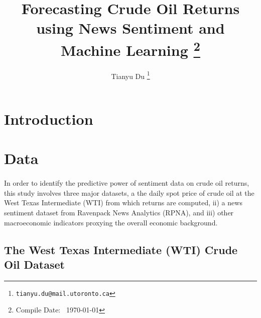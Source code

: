 \documentclass[12pt]{article}
\title{Forecasting Crude Oil Returns using News Sentiment and Machine Learning \footnote{Compile Date: \currenttime\ \today}}
\author{Tianyu Du \footnote{\texttt{tianyu.du@mail.utoronto.ca}}}
\begin{document}
	\maketitle
	\tableofcontents
	\newpage
	\section{Introduction}
	
	\section{Data}
	\paragraph{}In order to identify the predictive power of sentiment data on crude oil returns, this study involves three major datasets, a the daily spot price of crude oil at the West Texas Intermediate (WTI) from which returns are computed, ii) a news sentiment dataset from Ravenpack News Analytics (RPNA), and iii) other macroeconomic indicators proxying the overall economic background.

	\subsection{The West Texas Intermediate (WTI) Crude Oil Dataset}
	
\end{document}
